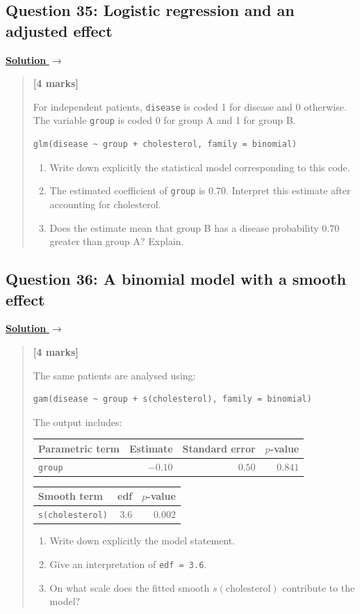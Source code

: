 \documentclass[11pt,a4paper]{article}
\newenvironment{examquestion}[2]
  {\subsection{#1}\label{question:\arabic{subsection}}\label{#2}%
   \noindent\hyperref[answer:\arabic{subsection}]{\textbf{Solution} $\rightarrow$}%
   \begin{quote}\color{statgrey}}
  {\end{quote}}
\begin{document}
\clearpage

\begin{examquestion}{Question 35: Logistic regression and an adjusted effect}{question:practice-logistic-regression-and-an-adjusted-effect}
\textbf{[4 marks]}

For independent patients, \texttt{disease} is coded 1 for disease and 0
otherwise. The variable \texttt{group} is coded 0 for group A and 1 for
group B.
\begin{verbatim}
glm(disease ~ group + cholesterol, family = binomial)
\end{verbatim}
\begin{enumerate}[label=(\alph*)]
  \item Write down explicitly the statistical model corresponding to this
        code.
  \item The estimated coefficient of \texttt{group} is $0.70$. Interpret
        this estimate after accounting for cholesterol.
  \item Does the estimate mean that group B has a disease probability
        $0.70$ greater than group A? Explain.
\end{enumerate}
\end{examquestion}

\clearpage

\begin{examquestion}{Question 36: A binomial model with a smooth effect}{question:practice-a-binomial-model-with-a-smooth-effect}
\textbf{[4 marks]}

The same patients are analysed using:
\begin{verbatim}
gam(disease ~ group + s(cholesterol), family = binomial)
\end{verbatim}
The output includes:
\begin{center}
\begin{tabular}{lrrr}
\hline
Parametric term & Estimate & Standard error & $p$-value\\
\hline
\texttt{group} & $-0.10$ & $0.50$ & $0.841$\\
\hline
\end{tabular}
\end{center}
\begin{center}
\begin{tabular}{lrr}
\hline
Smooth term & edf & $p$-value\\
\hline
\texttt{s(cholesterol)} & $3.6$ & $0.002$\\
\hline
\end{tabular}
\end{center}
\begin{enumerate}[label=(\alph*)]
  \item Write down explicitly the model statement.
  \item Give an interpretation of \texttt{edf = 3.6}.
  \item On what scale does the fitted smooth $s(\text{cholesterol})$
        contribute to the model?
\end{enumerate}
\end{examquestion}
\end{document}
